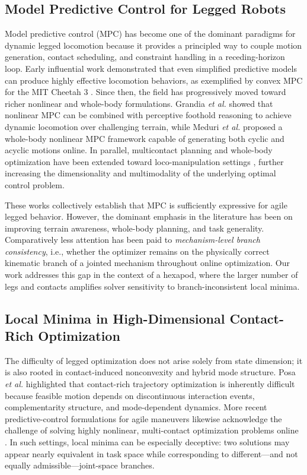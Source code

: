 \label{sec:related_work}

\subsection{Model Predictive Control for Legged Robots}

Model predictive control (MPC) has become one of the dominant paradigms for dynamic legged locomotion because it provides a principled way to couple motion generation, contact scheduling, and constraint handling in a receding-horizon loop. Early influential work demonstrated that even simplified predictive models can produce highly effective locomotion behaviors, as exemplified by convex MPC for the MIT Cheetah 3 \cite{dicarlo2018convexmpc}. Since then, the field has progressively moved toward richer nonlinear and whole-body formulations. Grandia \emph{et al.} \cite{grandia2023perceptive} showed that nonlinear MPC can be combined with perceptive foothold reasoning to achieve dynamic locomotion over challenging terrain, while Meduri \emph{et al.} \cite{meduri2022biconmp} proposed a whole-body nonlinear MPC framework capable of generating both cyclic and acyclic motions online. In parallel, multicontact planning and whole-body optimization have been extended toward loco-manipulation settings \cite{sleiman2023versatile}, further increasing the dimensionality and multimodality of the underlying optimal control problem.

These works collectively establish that MPC is sufficiently expressive for agile legged behavior. However, the dominant emphasis in the literature has been on improving terrain awareness, whole-body planning, and task generality. Comparatively less attention has been paid to \emph{mechanism-level branch consistency}, i.e., whether the optimizer remains on the physically correct kinematic branch of a jointed mechanism throughout online optimization. Our work addresses this gap in the context of a hexapod, where the larger number of legs and contacts amplifies solver sensitivity to branch-inconsistent local minima.

\subsection{Local Minima in High-Dimensional Contact-Rich Optimization}

The difficulty of legged optimization does not arise solely from state dimension; it is also rooted in contact-induced nonconvexity and hybrid mode structure. Posa \emph{et al.} \cite{posa2014direct} highlighted that contact-rich trajectory optimization is inherently difficult because feasible motion depends on discontinuous interaction events, complementarity structure, and mode-dependent dynamics. More recent predictive-control formulations for agile maneuvers likewise acknowledge the challenge of solving highly nonlinear, multi-contact optimization problems online \cite{mastalli2022agile}. In such settings, local minima can be especially deceptive: two solutions may appear nearly equivalent in task space while corresponding to different---and not equally admissible---joint-space branches.

